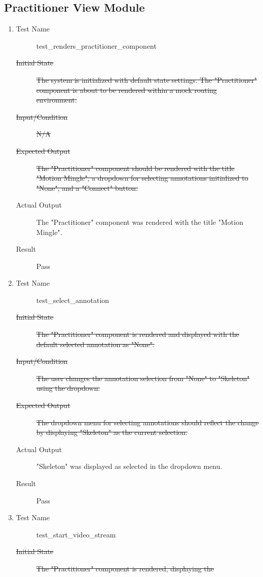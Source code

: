 \documentclass[12pt, titlepage]{article}
\begin{document}
\subsection{Practitioner View Module}
\begin{enumerate}[UT-PV1]
\item \label{UT-PV1}
  \begin{description}
  \item[Test Name] test\_renders\_practitioner\_component
  \item[\sout{Initial State}]\sout{ The system is initialized with default state settings.
    The "Practitioner" component is about to be rendered within a mock routing
    environment.
  }
		\item[\sout{Input/Condition}]\sout{ N/A
  }
		\item[\sout{Expected Output}]\sout{ The "Practitioner" component should be rendered with
    the title "Motion Mingle", a dropdown for selecting annotations initialized
    to "None", and a "Connect" button.
  }
		\item[Actual Output] The "Practitioner" component was rendered with the title
    "Motion Mingle".
  \item[Result] Pass
  \end{description}
\item \label{UT-PV2}
  \begin{description}
  \item[Test Name] test\_select\_annotation
  \item[\sout{Initial State}]\sout{ The "Practitioner" component is rendered and displayed
    with the default selected annotation as "None".
  }
		\item[\sout{Input/Condition}]\sout{ The user changes the annotation selection from "None"
    to "Skeleton" using the dropdown.
  }
		\item[\sout{Expected Output}]\sout{ The dropdown menu for selecting annotations should
    reflect the change by displaying "Skeleton" as the current selection.
  }
		\item[Actual Output] "Skeleton" was displayed as selected in the dropdown
    menu.
  \item[Result] Pass
  \end{description}
\item \label{UT-PV3}
  \begin{description}
  \item[Test Name] test\_start\_video\_stream
  \item[\sout{Initial State}]\sout{ The "Practitioner" component is rendered, displaying the
}
\end{description}
\end{enumerate}
\end{document}
